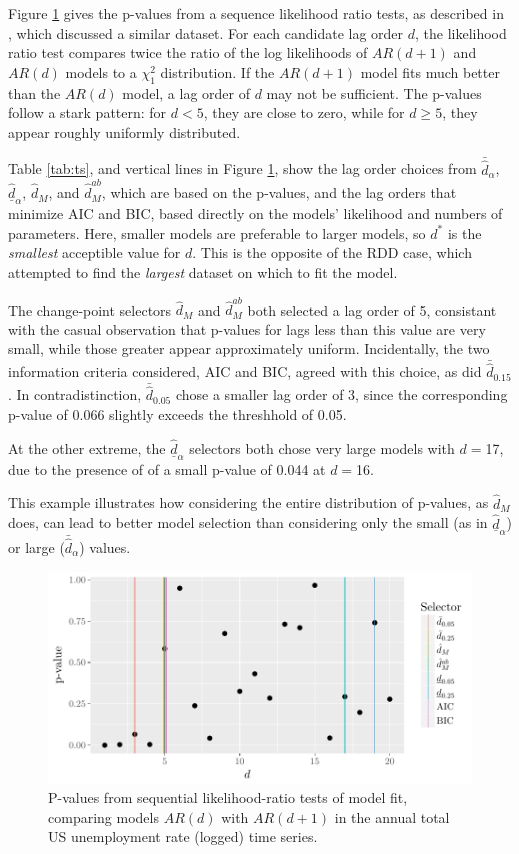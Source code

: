 \documentclass[12pt]{article}\usepackage[]{graphicx}\usepackage[]{color}
\makeatletter
\def\maxwidth{ %
  \ifdim\Gin@nat@width>\linewidth
    \linewidth
  \else
    \Gin@nat@width
  \fi
}
\newcommand{\dalphaU}{\bar{\hat{d}}_\alpha}
\newcommand{\dalphaB}{\underline{\hat{d}}_\alpha}
\newcommand{\dstar}{d^*}
\newcommand{\dhatU}{\bar{\hat{d}}}
\newcommand{\dhatm}{\hat{d}_M}
\newcommand{\dhatmab}{\hat{d}^{ab}_M}
\makeatother
\begin{document}
Figure \ref{fig:tspvalues1} gives the p-values from a sequence
likelihood ratio tests, as described in \citet[][Ch.1]{urca}, which
discussed a similar dataset.
For each candidate lag order $d$, the likelihood ratio test compares
twice the ratio of the log likelihoods of $AR(d+1)$ and $AR(d)$ models
to a $\chi^2_1$ distribution.
If the $AR(d+1)$ model fits much better than the $AR(d)$ model, a lag
order of $d$ may not be sufficient.
The p-values follow a stark pattern: for $d<5$, they are close to
zero, while for $d\ge5$, they appear roughly uniformly distributed.

Table \ref{tab:ts}, and vertical lines in Figure \ref{fig:tspvalues1},
show the lag order choices from $\dalphaU$, $\dalphaB$, $\dhatm$, and
$\dhatmab$, which are based on the p-values, and the lag orders that
minimize AIC and BIC, based directly on the models' likelihood and numbers
of parameters.
Here, smaller models are preferable to larger models, so $\dstar$ is
the \emph{smallest} acceptible value for $d$.
This is the opposite of the RDD case, which attempted to find the
\emph{largest} dataset on which to fit the model.






The change-point selectors $\dhatm$ and $\dhatmab$ both selected a
lag order of 5, consistant with the casual
observation that p-values for lags less than this value are very
small, while those greater appear approximately uniform.
Incidentally, the two information criteria considered, AIC and BIC,
agreed with this choice, as did $\dhatU_{0.15}$.
In contradistinction, $\dhatU_{0.05}$ chose a smaller lag order of
3, since the corresponding p-value of
0.066 slightly exceeds the threshhold of 0.05.

At the other extreme, the $\dalphaB$ selectors both chose very large
models with $d=$17, due to the presence of
of a small p-value of
0.044 at
$d=$16.

This example illustrates how considering the entire distribution of
p-values, as $\dhatm$ does, can lead to better model selection than
considering only the small (as in $\dalphaB$) or large ($\dalphaU$)
values.


\begin{figure}

\includegraphics[width=\maxwidth]{figure/tsResults-1} 

\caption{P-values from sequential likelihood-ratio tests of model fit,
  comparing models $AR(d)$ with $AR(d+1)$ in the annual total US
  unemployment rate (logged) time series.}
\label{fig:tspvalues1}
\end{figure}
\end{document}
